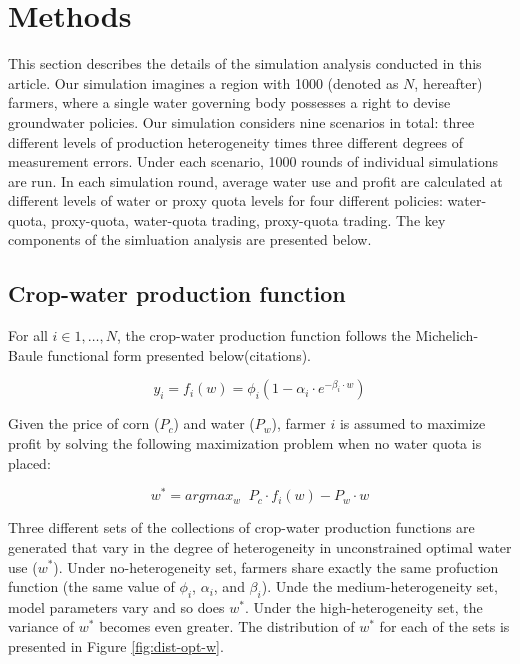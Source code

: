 \documentclass[
]{article}
\begin{document}
\section{Methods}\label{methods}

This section describes the details of the simulation analysis conducted in this article. Our simulation imagines a region with 1000 (denoted as \(N\), hereafter) farmers, where a single water governing body possesses a right to devise groundwater policies. Our simulation considers nine scenarios in total: three different levels of production heterogeneity times three different degrees of measurement errors. Under each scenario, 1000 rounds of individual simulations are run. In each simulation round, average water use and profit are calculated at different levels of water or proxy quota levels for four different policies: water-quota, proxy-quota, water-quota trading, proxy-quota trading. The key components of the simluation analysis are presented below.

\subsection{Crop-water production function}\label{crop-water-production-function}

For all \(i \in 1,\dots, N\), the crop-water production function follows the Michelich-Baule functional form presented below(citations).

\begin{equation}
y_i = f_i(w) = \phi_i (1 - \alpha_i \cdot e^{-\beta_i\cdot w})
\end{equation}

Given the price of corn (\(P_c\)) and water (\(P_w\)), farmer \(i\) is assumed to maximize profit by solving the following maximization problem when no water quota is placed:

\begin{equation}
w^* = argmax_{w} \;\; P_c \cdot f_i(w) - P_w \cdot w
\end{equation}

Three different sets of the collections of crop-water production functions are generated that vary in the degree of heterogeneity in unconstrained optimal water use (\(w^*\)). Under no-heterogeneity set, farmers share exactly the same profuction function (the same value of \(\phi_i\), \(\alpha_i\), and \(\beta_i\)). Unde the medium-heterogeneity set, model parameters vary and so does \(w^*\). Under the high-heterogeneity set, the variance of \(w^*\) becomes even greater. The distribution of \(w^*\) for each of the sets is presented in Figure \ref{fig:dist-opt-w}.
\end{document}
